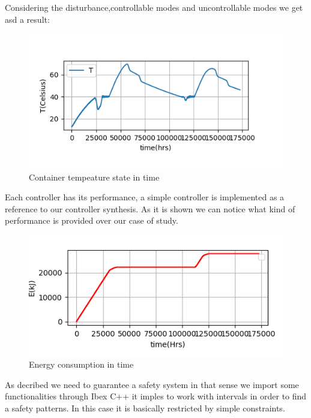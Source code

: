 \documentclass[conference]{IEEEtran}
\begin{document}
  

Considering the disturbance,controllable modes and uncontrollable modes we get 
asd a result:

\begin{figure}[H]  %
\includegraphics[scale = 0.5]{1}
\caption{Container tempeature state in time}
\centering
\end{figure}



Each controller has its performance, a simple controller is implemented as
a reference to our controller synthesis. As it is  shown we can notice what 
kind of performance is provided over our case of study.

\begin{figure}[H]
  \includegraphics[scale = 0.5]{3_2}
  \caption{ Energy consumption in time}
  \centering
\end{figure}


As decribed we need to guarantee a safety system in that sense we import some 
functionalities through Ibex C++ it imples to work with intervals in order
to find a safety patterns. In this case it is basically restricted by simple
constraints.
\end{document}

